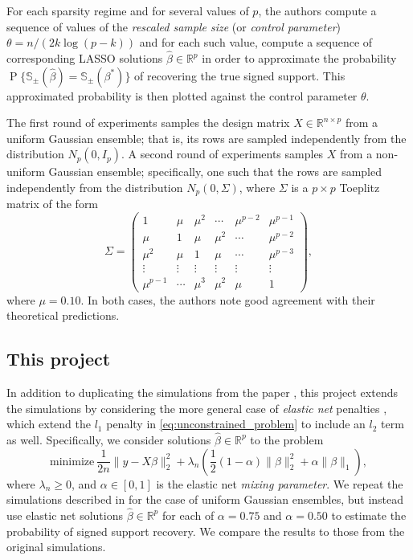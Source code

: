 \documentclass[letterpaper,12pt]{article}
\DeclareMathOperator{\prob}{P}
\newcommand{\norm}[1]{\lVert#1\rVert}
\begin{document}
For each sparsity regime and for several values of $p$, the authors
compute a sequence of values of the \textit{rescaled sample size} (or
\textit{control parameter}) $\theta = n / (2k \log(p -k))$ and for
each such value, compute a sequence of corresponding LASSO solutions
$\hat{\beta} \in \mathbb{R}^p$ in order to approximate the probability
$\prob\{\mathbb{S}_\pm(\hat{\beta}) = \mathbb{S}_\pm(\beta^\ast)\}$ of
recovering the true signed support. This approximated probability is
then plotted against the control parameter $\theta$.

The first round of experiments samples the design matrix
$X \in \mathbb{R}^{n \times p}$ from a uniform Gaussian ensemble; that
is, its rows are sampled independently from the distribution
$N_p(0, I_p)$. A second round of experiments samples $X$ from a
non-uniform Gaussian ensemble; specifically, one such that the rows
are sampled independently from the distribution $N_p(0, \Sigma)$,
where $\Sigma$ is a $p \times p$ Toeplitz matrix of the form
\begin{equation} \label{eq:toeplitz_covariance}
  \Sigma =
  \begin{pmatrix}
    1 & \mu & \mu^2 & \cdots & \mu^{p-2} & \mu^{p-1} \\
    \mu & 1 & \mu & \mu^2 & \cdots & \mu^{p-2} \\
    \mu^2 & \mu & 1 & \mu & \cdots & \mu^{p-3} \\
    \vdots & \vdots & \vdots & \vdots & \vdots & \vdots \\
    \mu^{p-1} & \cdots & \mu^3 & \mu^2 & \mu & 1
  \end{pmatrix},
\end{equation}
where $\mu = 0.10$. In both cases, the authors note good agreement
with their theoretical predictions.

\subsection*{This project}

In addition to duplicating the simulations from the paper
\cite{wainwright06}, this project extends the simulations by
considering the more general case of \textit{elastic net} penalties
\cite{zou_hastie05}, which extend the $l_1$ penalty in
\eqref{eq:unconstrained_problem} to include an $l_2$ term as
well. Specifically, we consider solutions
$\hat{\beta} \in \mathbb{R}^p$ to the problem
\begin{equation} \label{eq:elastic_net_problem}
  \text{minimize} \
    \frac{1}{2n} \norm{y - X\beta}_2^2
      + \lambda_n \left( \frac{1}{2} (1 - \alpha) \norm{\beta}_2^2
      + \alpha \norm{\beta}_1 \right ),
\end{equation}
where $\lambda_n \geq 0$, and $\alpha \in [0, 1]$ is the elastic net
\textit{mixing parameter}. We repeat the simulations described in
\cite{wainwright06} for the case of uniform Gaussian ensembles, but
instead use elastic net solutions $\hat{\beta} \in \mathbb{R}^p$ for
each of $\alpha = 0.75$ and $\alpha = 0.50$ to estimate the
probability of signed support recovery. We compare the results to
those from the original simulations.
\end{document}
